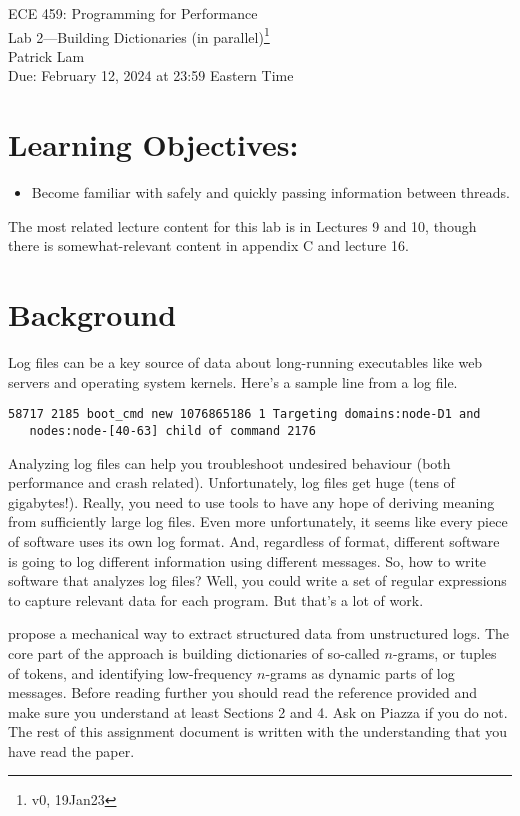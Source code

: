 \documentclass[12pt]{article}
\renewcommand{\_}{\kern-1.5pt\textunderscore\kern-1.5pt}
\begin{document}
\begin{center}
{\Large ECE 459: Programming for Performance}\\
{\Large Lab 2---Building Dictionaries (in parallel)\footnote{v0, 19Jan23}}\\[1em]
Patrick Lam\\
Due: February 12, 2024 at 23:59 Eastern Time
\end{center}

\section*{Learning Objectives:}

\begin{itemize}[noitemsep]
	\item Become familiar with safely and quickly passing information between threads.
\end{itemize}

The most related lecture content for this lab is in Lectures 9 and 10, though there is somewhat-relevant content in appendix C and lecture 16.

\section*{Background}
Log files can be a key source of data about long-running executables like web servers and operating system kernels. Here's a sample line from a log file.

\begin{verbatim}
58717 2185 boot_cmd new 1076865186 1 Targeting domains:node-D1 and
   nodes:node-[40-63] child of command 2176
\end{verbatim}

Analyzing log files can help you troubleshoot undesired behaviour (both performance and crash related). Unfortunately, log files get huge (tens of gigabytes!). Really, you need to use tools to have any hope of deriving meaning from sufficiently large log files. Even more unfortunately, it seems like every piece of software uses its own log format. And, regardless of format, different software is going to log different information using different messages. So, how to write software that analyzes log files? Well, you could write a set of regular expressions to capture relevant data for each program. But that's a lot of work.

\cite{dai22} propose a mechanical way to extract structured data from unstructured logs. The core part of the approach is building dictionaries of so-called $n$-grams, or tuples of tokens, and identifying low-frequency $n$-grams as dynamic parts of log messages. Before reading further you should read the reference provided and make sure you understand at least Sections 2 and 4. Ask on Piazza if you do not. The rest of this assignment document is written with the understanding that you have read the paper.
\end{document}
